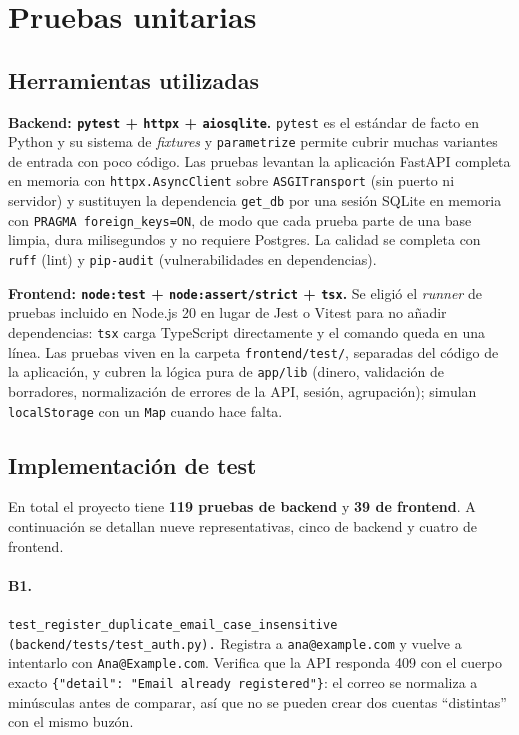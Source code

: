 \section{Pruebas unitarias}

\subsection{Herramientas utilizadas}
\textbf{Backend: \texttt{pytest} + \texttt{httpx} + \texttt{aiosqlite}.} \texttt{pytest} es el estándar de facto en Python y su sistema de \emph{fixtures} y \texttt{parametrize} permite cubrir muchas variantes de entrada con poco código. Las pruebas levantan la aplicación FastAPI completa en memoria con \texttt{httpx.AsyncClient} sobre \texttt{ASGITransport} (sin puerto ni servidor) y sustituyen la dependencia \texttt{get\_db} por una sesión SQLite en memoria con \texttt{PRAGMA foreign\_keys=ON}, de modo que cada prueba parte de una base limpia, dura milisegundos y no requiere Postgres. La calidad se completa con \texttt{ruff} (lint) y \texttt{pip-audit} (vulnerabilidades en dependencias).

\textbf{Frontend: \texttt{node:test} + \texttt{node:assert/strict} + \texttt{tsx}.} Se eligió el \emph{runner} de pruebas incluido en Node.js 20 en lugar de Jest o Vitest para no añadir dependencias: \texttt{tsx} carga TypeScript directamente y el comando queda en una línea. Las pruebas viven en la carpeta \texttt{frontend/test/}, separadas del código de la aplicación, y cubren la lógica pura de \texttt{app/lib} (dinero, validación de borradores, normalización de errores de la API, sesión, agrupación); simulan \texttt{localStorage} con un \texttt{Map} cuando hace falta.

\subsection{Implementación de test}
En total el proyecto tiene \textbf{119 pruebas de backend} y \textbf{39 de frontend}. A continuación se detallan nueve representativas, cinco de backend y cuatro de frontend.

\paragraph{B1.} \texttt{test\_register\_duplicate\_email\allowbreak\_case\_insensitive (backend/\allowbreak tests/\allowbreak test\_auth.py).}
Registra a \texttt{ana@example.com} y vuelve a intentarlo con \texttt{Ana@Example.com}. Verifica que la API responda 409 con el cuerpo exacto \texttt{\{"detail": "Email already registered"\}}: el correo se normaliza a minúsculas antes de comparar, así que no se pueden crear dos cuentas ``distintas'' con el mismo buzón.

